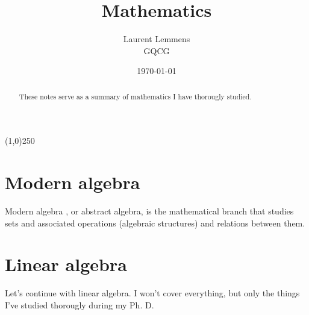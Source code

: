 \documentclass[12pt]{article}
\title{Mathematics}
\author{Laurent Lemmens \\ GQCG}
\date{\today \hspace{6pt} \currenttime}
\begin{document}
\maketitle


\begin{abstract} \noindent  %
    These notes serve as a summary of mathematics I have thorougly studied.
\end{abstract}

\begin{center}
    \line(1,0){250}
\end{center}

\tableofcontents
\newpage


\section{Modern algebra}
    Modern algebra \cite{joyce2008}, or abstract algebra, is the mathematical branch that studies sets and associated operations (algebraic structures) and relations between them.

    

    

    

    


\section{Linear algebra}
    Let's continue with linear algebra. I won't cover everything, but only the things I've studied thorougly during my Ph. D.

    \newpage
    

    \newpage
    

    \newpage
    


\newpage
\begin{appendices}
    
\end{appendices}


\newpage

\end{document}
